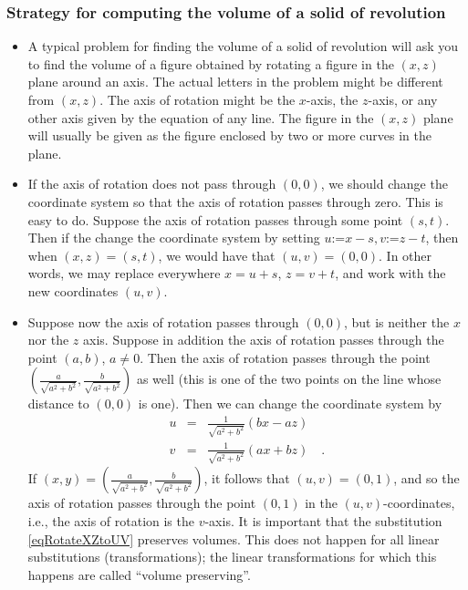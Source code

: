 \documentclass[12pt]{book}
\newcommand{\eqdef}{\textbf{:=}}
\begin{document}
\subsubsection{Strategy for computing the volume of a solid of revolution}
\begin{itemize}
\item A typical problem for finding the volume of a solid of revolution will ask you to find the volume of a figure obtained by rotating a figure in the $(x,z)$ plane around an axis. The actual letters in the problem might be different from $(x,z)$. The axis of rotation might be the $x$-axis, the $z$-axis, or any other axis given by the equation of any line. The figure in the $(x,z)$ plane will usually be given as the figure enclosed by two or more curves in the plane.
\item If the axis of rotation does not pass through $(0,0)$, we should change the coordinate system so that the axis of rotation passes through zero. This is easy to do. Suppose the axis of rotation passes through some point $(s,t)$. Then if the change the coordinate system by setting $u\eqdef x-s, v\eqdef z-t$, then when $(x,z)=(s,t)$, we would have that $(u,v)=(0,0)$. In other words, we may replace everywhere $x=u+s$, $z=v+t$, and work with the new coordinates $(u,v)$.
\item Suppose now the axis of rotation passes through $(0,0)$, but is neither the $x$ nor the $z$ axis. Suppose in addition the axis of rotation passes through the point $(a,b)$, $a\neq 0$. Then the axis of rotation passes through the point $(\frac{a}{\sqrt{a^2+b^2}},\frac{b}{\sqrt{a^2+b^2}})$ as well (this is one of the two points on the line whose distance to $(0,0)$ is one). Then we can change the coordinate system by 
\begin{equation}\label{eqRotateXZtoUV}
\begin{array}{rcl}
u &=&\frac{1}{\sqrt{a^2+b^2}}\left( bx-az\right)\\
v &=& \frac{1}{\sqrt{a^2+b^2}}\left( ax+bz\right)\quad .
\end{array}
\end{equation}
If $(x,y)=(\frac{a}{\sqrt{a^2+b^2}},\frac{b}{\sqrt{a^2+b^2}})$, it follows that $(u,v)=(0,1)$, and so the axis of rotation passes through the point $(0,1)$ in the $(u,v)$-coordinates, i.e., the axis of rotation is the $v$-axis. It is important that the substitution \eqref{eqRotateXZtoUV} preserves volumes. This does not happen for all linear substitutions (transformations); the linear transformations for which this happens are called ``volume preserving''. 


\end{itemize}
\end{document}
